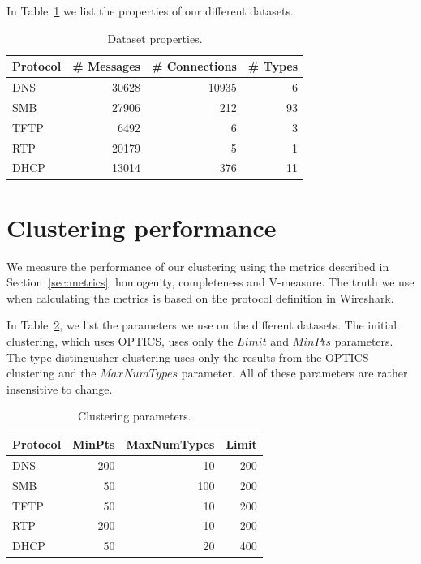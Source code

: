 \documentclass[a4paper]{report}
\begin{document}
In Table~\ref{tab:datasets} we list the properties of our different datasets.


\begin{table}[h]
    \centering
    \captionsetup{width=0.8\textwidth}
    \caption{Dataset properties.}
    \begin{tabular}{| l | r | r | r |}
        \hline
        \textbf{Protocol}&\textbf{\# Messages}&\textbf{\# Connections}&\textbf{\# Types}\\ \hline
        DNS         & 30628         & 10935         & 6         \\ \hline
        SMB         & 27906         & 212           & 93        \\ \hline
        TFTP        & 6492          & 6             & 3         \\ \hline
        RTP         & 20179         & 5             & 1         \\ \hline
        DHCP        & 13014         & 376           & 11        \\ \hline
    \end{tabular}
    \label{tab:datasets}
\end{table}

\section{Clustering performance}
\label{sec:clustperf}
We measure the performance of our clustering using the metrics described in
Section~\ref{sec:metrics}: homogenity, completeness and V-measure. The truth we
use when calculating the metrics is based on the protocol definition in
Wireshark.

In Table~\ref{tab:clusterparams}, we list the parameters we use on the
different datasets. The initial clustering, which uses OPTICS, uses only the
$Limit$ and $MinPts$ parameters. The type distinguisher clustering uses only
the results from the OPTICS clustering and the $MaxNumTypes$ parameter. All of
these parameters are rather insensitive to change.

\begin{table}[h]
    \centering
    \captionsetup{width=0.8\textwidth}
    \caption{Clustering parameters.}
    \begin{tabular}{| l | r | r | r |}
        \hline
        \textbf{Protocol}&\textbf{MinPts}&\textbf{MaxNumTypes}&\textbf{Limit} \\ \hline
        DNS & 200 & 10 & 200 \\ \hline
        SMB & 50 & 100 & 200 \\ \hline
        TFTP & 50 & 10 & 200 \\ \hline
        RTP & 200 & 10 & 200 \\ \hline
        DHCP & 50 & 20 & 400 \\ \hline
    \end{tabular}
    \label{tab:clusterparams}
\end{table}
\end{document}
